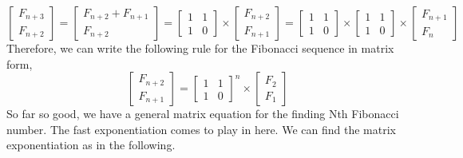 \documentclass[12pt]{article}
\begin{document}
\[
\begin{bmatrix}
    F_{n+3}\\
    F_{n+2}
\end{bmatrix}
= 
\begin{bmatrix}
    F_{n+2} + F_{n+1}\\
    F_{n+2}
\end{bmatrix}
=
\begin{bmatrix} 
    1 & 1  \\
    1 & 0
\end{bmatrix}
\times
\begin{bmatrix}
    F_{n+2} \\
    F_{n+1}
\end{bmatrix}
=
\begin{bmatrix} 
    1 & 1  \\
    1 & 0
\end{bmatrix}
\times
\begin{bmatrix} 
    1 & 1  \\
    1 & 0
\end{bmatrix}
\times
\begin{bmatrix}
    F_{n+1} \\
    F_{n}
\end{bmatrix}
\]
Therefore, we can write the following rule for the Fibonacci sequence in matrix form,
\[ \begin{bmatrix}
    F_{n+2}\\
    F_{n+1}
\end{bmatrix}
=
\begin{bmatrix}
    1 & 1  \\
    1 & 0
\end{bmatrix}^{n}
\times
\begin{bmatrix}
    F_2 \\
    F_1
\end{bmatrix} \]
So far so good, we have a general matrix equation for the finding Nth Fibonacci number. The fast exponentiation comes to play in here. We can find the matrix exponentiation as in the following.
\end{document}
